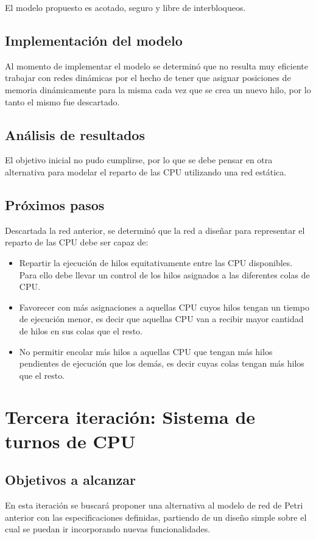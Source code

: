 \documentclass[a4paper]{book}
\begin{document}
El modelo propuesto es acotado, seguro y libre de interbloqueos.

\subsection{Implementaci\'on del modelo}
Al momento de implementar el modelo se determin\'o que no resulta muy eficiente trabajar con redes din\'amicas por el hecho de tener que asignar posiciones de memoria din\'amicamente para la misma cada vez que se crea un nuevo hilo, por lo tanto el mismo fue descartado.

\subsection{An\'alisis de resultados}
El objetivo inicial no pudo cumplirse, por lo que se debe pensar en otra alternativa para modelar el reparto de las CPU utilizando una red est\'atica.

\subsection{Pr\'oximos pasos}
Descartada la red anterior, se determin\'o que la red a dise\~nar para representar el reparto de las CPU debe ser capaz de:
\begin{itemize}
\item Repartir la ejecuci\'on de hilos equitativamente entre las CPU disponibles. Para ello debe llevar un control de los hilos asignados a las diferentes colas de CPU.
\item Favorecer con m\'as asignaciones a aquellas CPU cuyos hilos tengan un tiempo de ejecuci\'on menor, es decir que aquellas CPU van a recibir mayor cantidad de hilos en sus colas que el resto.
\item No permitir encolar m\'as hilos a aquellas CPU que tengan m\'as hilos pendientes de ejecuci\'on que los dem\'as, es decir cuyas colas tengan m\'as hilos que el resto.
\end{itemize}


\newpage
\section{Tercera iteraci\'on: Sistema de turnos de CPU}

\subsection{Objetivos a alcanzar}
En esta iteraci\'on se buscar\'a proponer una alternativa al modelo de red de Petri anterior con las especificaciones definidas, partiendo de un dise\~no simple sobre el cual se puedan ir incorporando nuevas funcionalidades.
\end{document}
